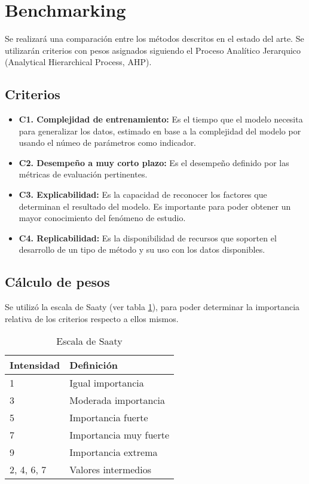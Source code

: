 \section{Benchmarking}

Se realizará una comparación entre los métodos descritos en el estado del arte. 
Se utilizarán criterios con pesos asignados siguiendo el Proceso Analítico 
Jerarquico (Analytical Hierarchical Process, AHP).
		
\subsection{Criterios}

\begin{itemize}
  \item \textbf{C1. Complejidad de entrenamiento:} Es el tiempo que 
  el modelo necesita para generalizar los datos, estimado en base a la 
  complejidad del modelo por usando el númeo de parámetros como indicador.
  \item \textbf{C2. Desempeño a muy corto plazo:} Es el desempeño definido por 
  las métricas de evaluación pertinentes.
  \item \textbf{C3. Explicabilidad:} Es la capacidad de reconocer los factores 
  que determinan el resultado del modelo. Es importante para poder obtener un 
  mayor conocimiento del fenómeno de estudio.
  \item \textbf{C4. Replicabilidad:} Es la disponibilidad de recursos que 
  soporten el desarrollo de un tipo de método y su uso con los datos 
  disponibles.
\end{itemize}

\subsection{Cálculo de pesos}
Se utilizó la escala de Saaty (ver tabla \ref{tab:escala_saaty}), para poder 
determinar la importancia relativa de los criterios respecto a ellos mismos.

\begin{table}[H]
  \centering
  \caption{Escala de Saaty}
  \begin{tabular}{ll}
  \textbf{Intensidad} & \textbf{Definición}    \\ \hline
  1                   & Igual importancia      \\
  3                   & Moderada importancia   \\
  5                   & Importancia fuerte     \\
  7                   & Importancia muy fuerte \\
  9                   & Importancia extrema    \\
  2, 4, 6, 7          & Valores intermedios   
  \end{tabular}
  \label{tab:escala_saaty}
\end{table}


